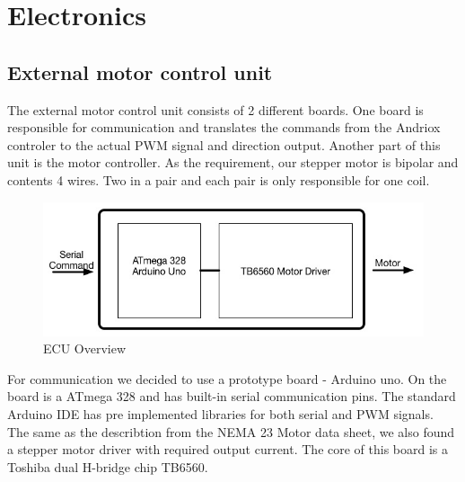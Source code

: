 \documentclass[11pt,a4paper]{article}
\begin{document}





\newpage
\section{Electronics}
\subsection{External motor control unit}

The external motor control unit consists of 2 different boards. One board is responsible for communication and translates the commands from the Andriox controler to the actual PWM signal and direction output. Another part of this unit is the motor controller. As the requirement, our stepper motor is bipolar and contents 4 wires. Two in a pair and each pair is only responsible for one coil.\\

\begin{figure}[h!]
	\centering
	\includegraphics[scale=0.5]{img/ECU-inter.jpg}
	\caption{ECU Overview}
	\label{fig:ECU Overview}
\end{figure}

For communication we decided to use a prototype board - Arduino uno. On the board is a ATmega 328 and has built-in serial communication pins. The standard Arduino IDE has pre implemented libraries for both serial and PWM signals.\\

The same as the describtion from the NEMA 23 Motor data sheet, we also found a stepper motor driver with required output current. The core of this board is a Toshiba dual H-bridge chip TB6560.\\
\end{document}
